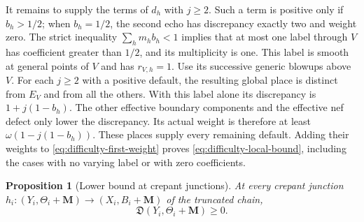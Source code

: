 \documentclass[11pt]{amsart}
\newtheorem{proposition}[theorem]{Proposition}
\theoremstyle{definition}
\theoremstyle{remark}
\numberwithin{equation}{section}
\newcommand{\M}{\mathbf{M}}
\begin{document}
It remains to supply the terms of \(d_h\) with \(j\geq2\).  Such a term
is positive only if \(b_h>1/2\); when \(b_h=1/2\), the second echo has
discrepancy exactly two and weight zero.  The strict inequality
\(\sum_hm_hb_h<1\) implies that at most one label through \(V\) has
coefficient greater than \(1/2\), and its multiplicity is one.  This label
is smooth at general points of \(V\) and has \(r_{V,h}=1\).  Use its
successive generic blowups above \(V\).  For each \(j\geq2\) with a
positive default, the resulting global place is distinct from \(E_V\) and
from all the others.  With this label alone its discrepancy is
\(1+j(1-b_h)\).  The other effective boundary components and the effective
nef defect only lower the discrepancy.  Its actual weight is therefore at
least \(\omega(1-j(1-b_h))\).  These places supply every remaining
default.  Adding their weights to \eqref{eq:difficulty-first-weight}
proves \eqref{eq:difficulty-local-bound}, including the cases with no
varying label or with zero coefficients.

\begin{proposition}[Lower bound at crepant junctions]
\label{prop:difficulty-lower}
At every crepant junction \(h_i:(Y_i,\Theta_i+\M)\to(X_i,B_i+\M)\) of
the truncated chain,
\[
 \mathfrak D(Y_i,\Theta_i+\M)\geq0.
\]
\end{proposition}
\end{document}
